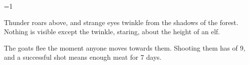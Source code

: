 \ifnum\value{cycle}=1

  \begin{boxtext}
    Thunder roars above, and strange eyes twinkle from the shadows of the forest.
    Nothing is visible except the twinkle, staring, about the height of an elf.
  \end{boxtext}

  The goats flee the moment anyone moves towards them.
  Shooting them has  of 9, and a successful shot means enough meat for 7 days.

\fi

